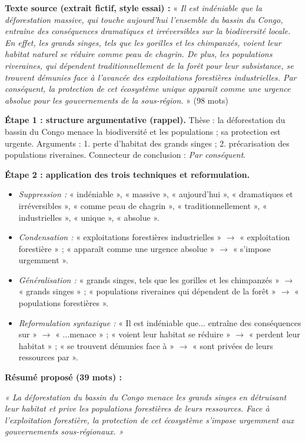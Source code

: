 \documentclass[11pt]{article}
\begin{document}
\begin{exoresolu}
\textbf{Texte source (extrait fictif, style essai) :}
« \textit{Il est indéniable que la déforestation massive, qui touche aujourd'hui l'ensemble du bassin du Congo, entraîne des conséquences dramatiques et irréversibles sur la biodiversité locale. En effet, les grands singes, tels que les gorilles et les chimpanzés, voient leur habitat naturel se réduire comme peau de chagrin. De plus, les populations riveraines, qui dépendent traditionnellement de la forêt pour leur subsistance, se trouvent démunies face à l'avancée des exploitations forestières industrielles. Par conséquent, la protection de cet écosystème unique apparaît comme une urgence absolue pour les gouvernements de la sous-région.} » (98 mots)

\textbf{Étape 1 : structure argumentative (rappel).}
Thèse : la déforestation du bassin du Congo menace la biodiversité et les populations ; sa protection est urgente.
Arguments : 1. perte d'habitat des grands singes ; 2. précarisation des populations riveraines. Connecteur de conclusion : \emph{Par conséquent}.

\textbf{Étape 2 : application des trois techniques et reformulation.}
\begin{itemize}
    \item \emph{Suppression :} « indéniable », « massive », « aujourd'hui », « dramatiques et irréversibles », « comme peau de chagrin », « traditionnellement », « industrielles », « unique », « absolue ».
    \item \emph{Condensation :} « exploitations forestières industrielles » $\to$ « exploitation forestière » ; « apparaît comme une urgence absolue » $\to$ « s'impose urgemment ».
    \item \emph{Généralisation :} « grands singes, tels que les gorilles et les chimpanzés » $\to$ « grands singes » ; « populations riveraines qui dépendent de la forêt » $\to$ « populations forestières ».
    \item \emph{Reformulation syntaxique :} « Il est indéniable que... entraîne des conséquences sur » $\to$ « ...menace » ; « voient leur habitat se réduire » $\to$ « perdent leur habitat » ; « se trouvent démunies face à » $\to$ « sont privées de leurs ressources par ».
\end{itemize}

\textbf{Résumé proposé (39 mots) :}
\par \textit{« La déforestation du bassin du Congo menace les grands singes en détruisant leur habitat et prive les populations forestières de leurs ressources. Face à l'exploitation forestière, la protection de cet écosystème s'impose urgemment aux gouvernements sous-régionaux. »}


\end{exoresolu}
\end{document}
